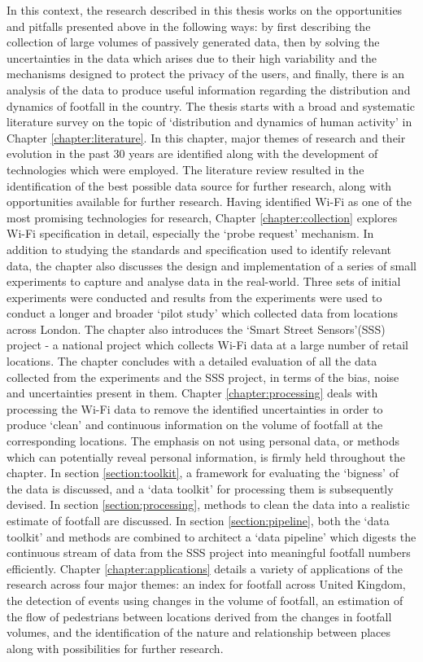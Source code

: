 In this context, the research described in this thesis works on the opportunities and pitfalls presented above in the following ways: by first describing the collection of large volumes of passively generated data, then by solving the uncertainties in the data which arises due to their high variability and the mechanisms designed to protect the privacy of the users, and finally, there is an analysis of the data to produce useful information regarding the distribution and dynamics of footfall in the country.
The thesis starts with a broad and systematic literature survey on the topic of `distribution and dynamics of human activity' in Chapter \ref{chapter:literature}.
In this chapter, major themes of research and their evolution in the past 30 years are identified along with the development of technologies which were employed.
The literature review resulted in the identification of the best possible data source for further research, along with opportunities available for further research.
Having identified Wi-Fi as one of the most promising technologies for research, Chapter \ref{chapter:collection} explores Wi-Fi specification in detail, especially the `probe request' mechanism.
In addition to studying the standards and specification used to identify relevant data, the chapter also discusses the design and implementation of a series of small experiments to capture and analyse data in the real-world.
Three sets of initial experiments were conducted and results from the experiments were used to conduct a longer and broader `pilot study' which collected data from locations across London.
The chapter also introduces the `Smart Street Sensors'(SSS) project - a national project which collects Wi-Fi data at a large number of retail locations.
The chapter concludes with a detailed evaluation of all the data collected from the experiments and the SSS project, in terms of the bias, noise and uncertainties present in them.
Chapter \ref{chapter:processing} deals with processing the Wi-Fi data to remove the identified uncertainties in order to produce `clean' and continuous information on the volume of footfall at the corresponding locations.
The emphasis on not using personal data, or methods which can potentially reveal personal information, is firmly held throughout the chapter.
In section \ref{section:toolkit}, a framework for evaluating the `bigness' of the data is discussed, and a `data toolkit' for processing them is subsequently devised.
In section \ref{section:processing}, methods to clean the data into a realistic estimate of footfall are discussed.
In section \ref{section:pipeline}, both the `data toolkit' and methods are combined to architect a `data pipeline' which digests the continuous stream of data from the SSS project into meaningful footfall numbers efficiently.
Chapter \ref{chapter:applications} details a variety of applications of the research across four major themes: an index for footfall across United Kingdom, the detection of events using changes in the volume of footfall, an estimation of the flow of pedestrians between locations derived from the changes in footfall volumes, and the identification of the nature and relationship between places along with possibilities for further research.

